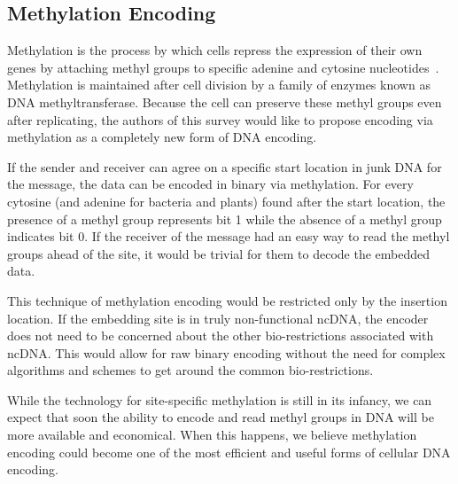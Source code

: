 \documentclass{bioinfo}
\begin{document}
\subsection{Methylation Encoding}

Methylation is the process by which cells repress the expression of their own genes by attaching methyl groups to specific adenine and cytosine nucleotides~\cite{RRBW2006B}. Methylation is maintained after cell division by a family of enzymes known as DNA methyltransferase. Because the cell can preserve these methyl groups even after replicating, the authors of this survey would like to propose encoding via methylation as a completely new form of DNA encoding.

If the sender and receiver can agree on a specific start location in junk DNA for the message, the data can be encoded in binary via methylation. For every cytosine (and adenine for bacteria and plants) found after the start location, the presence of a methyl group represents bit 1 while the absence of a methyl group indicates bit 0. If the receiver of the message had an easy way to read the methyl groups ahead of the site, it would be trivial for them to decode the embedded data.

This technique of methylation encoding would be restricted only by the insertion location. If the embedding site is in truly non-functional ncDNA, the encoder does not need to be concerned about the other bio-restrictions associated with ncDNA. This would allow for raw binary encoding without the need for complex algorithms and schemes to get around the common bio-restrictions.

While the technology for site-specific methylation is still in its infancy, we can expect that soon the ability to encode and read methyl groups in DNA will be more available and economical. When this happens, we believe methylation encoding could become one of the most efficient and useful forms of cellular DNA encoding.










\end{document}
